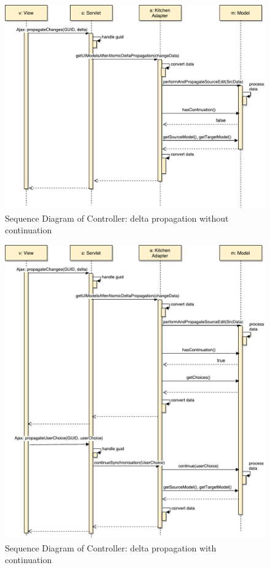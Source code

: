 \begin{figure}
	\centering
	\includegraphics[width=1\textwidth]{figures/Sequence_Diagram-Controller(cont-false)}
	\caption{Sequence Diagram of Controller: delta propagation without continuation}
	\label{fig:Sequence_Diagram-Controller(cont-false)}
\end{figure}

\begin{figure}
	\centering
	\includegraphics[width=1\textwidth]{figures/Sequence_Diagram-Controller(cont-true)}
	\caption{Sequence Diagram of Controller: delta propagation with continuation}
	\label{fig:Sequence_Diagram-Controller(cont-true)}
\end{figure}

